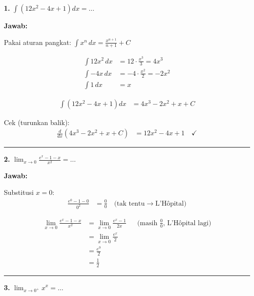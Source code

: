 \documentclass{article}
\begin{document}
\textbf{1.} $\displaystyle \int \left(12x^2 - 4x + 1\right) dx = \ldots$

\medskip
\textbf{Jawab:}

Pakai aturan pangkat: $\displaystyle \int x^n \, dx = \frac{x^{n+1}}{n+1} + C$

\begin{align*}
  \int 12x^2 \, dx &= 12 \cdot \frac{x^{3}}{3} = 4x^3 \\[6pt]
  \int -4x \, dx   &= -4 \cdot \frac{x^{2}}{2} = -2x^2 \\[6pt]
  \int 1 \, dx     &= x
\end{align*}

\begin{align*}
  \int \left(12x^2 - 4x + 1\right) dx &= 4x^3 - 2x^2 + x + C
\end{align*}

Cek (turunkan balik):
\begin{align*}
  \frac{d}{dx}\left(4x^3 - 2x^2 + x + C\right) &= 12x^2 - 4x + 1 \quad \checkmark
\end{align*}


\bigskip\hrule\bigskip

\textbf{2.} $\displaystyle \lim_{x \to 0} \frac{e^x - 1 - x}{x^2} = \ldots$

\medskip
\textbf{Jawab:}

Substitusi $x = 0$:
\begin{align*}
  \frac{e^0 - 1 - 0}{0^2} &= \frac{0}{0} \quad \text{(tak tentu} \rightarrow \text{L'H\^opital)}
\end{align*}

\begin{align*}
  \lim_{x \to 0} \frac{e^x - 1 - x}{x^2}
    &= \lim_{x \to 0} \frac{e^x - 1}{2x}
       && \text{(masih } \tfrac{0}{0} \text{, L'H\^opital lagi)} \\[6pt]
    &= \lim_{x \to 0} \frac{e^x}{2} \\[6pt]
    &= \frac{e^0}{2} \\[6pt]
    &= \frac{1}{2}
\end{align*}


\bigskip\hrule\bigskip

\textbf{3.} $\displaystyle \lim_{x \to 0^+} x^x = \ldots$
\end{document}
